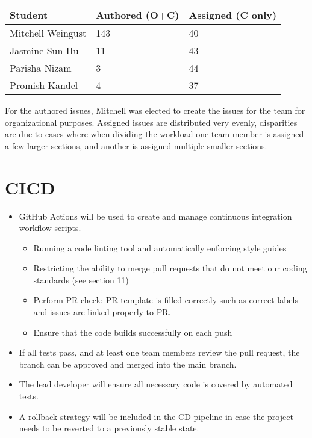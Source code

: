 \documentclass{article}
\begin{document}
\begin{table}[H]
\centering
\begin{tabular}{lll}
\toprule
\textbf{Student} & \textbf{Authored (O+C)} & \textbf{Assigned (C only)}\\
\midrule
Mitchell Weingust & 143 & 40 \\
Jasmine Sun-Hu & 11 & 43 \\
Parisha Nizam & 3 & 44 \\
Promish Kandel & 4 & 37 \\
\bottomrule
\end{tabular}
\end{table}

For the authored issues, Mitchell was elected to create the issues for the team for organizational purposes. Assigned issues are distributed very evenly, disparities are due to 
cases where when dividing the workload one team member is assigned a few larger sections, and another is assigned multiple smaller sections.

\section{CICD}
\begin{itemize}
	\item GitHub Actions will be used to create and manage continuous integration workflow scripts.
	\begin{itemize}
    \item Running a code linting tool and automatically enforcing style guides
    \item Restricting the ability to merge pull requests that do not meet our coding standards (see section 11)
    \item Perform PR check: PR template is filled correctly such as correct labels and issues are linked properly to PR. 
    \item Ensure that the code builds successfully on each push
  \end{itemize}
	\item If all tests pass, and at least one team members review the pull request, the branch can be approved and merged 
    into the main branch.
	\item The lead developer will ensure all necessary code is covered by automated tests.
	\item A rollback strategy will be included in the CD pipeline in case the project needs 
  to be reverted to a previously stable state.
\end{itemize}
\end{document}
